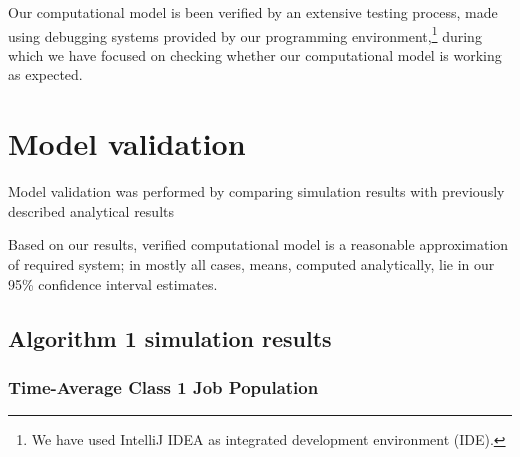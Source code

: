 \documentclass[10pt,a4paper]{article}
\begin{document}
Our computational model is been verified by an extensive testing process, made using debugging systems provided by our programming environment,\footnote{We have used IntelliJ IDEA as integrated development environment (IDE).} during which we have focused on checking whether our computational model is working as expected.

\section{Model validation}\label{sec:ModelValidation}

Model validation was performed by comparing simulation results with previously described analytical results

Based on our results, verified computational model is a reasonable approximation of required system; in mostly all cases, 
means, computed analytically, lie in our 95\% confidence interval estimates. 


\clearpage
\newpage
\subsection{Algorithm 1 simulation results}


\subsubsection{Time-Average Class 1 Job Population}
\end{document}

